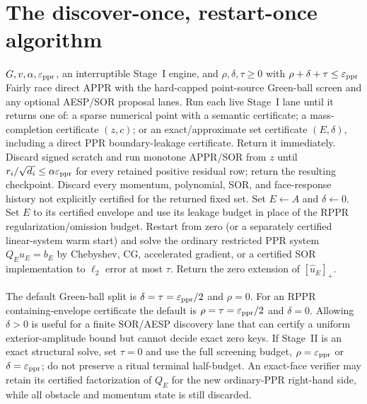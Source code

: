 \section{The discover-once, restart-once algorithm}
\label{sec:two-stage-algorithm}

\begin{algorithm}[t]
\caption{Certificate-first point-source hybrid with one optional continuation}
\label{alg:two-stage-hybrid}
\begin{algorithmic}[1]
\REQUIRE $G,v,\alpha,\varepsilon_{\mathrm{ppr}}$, an interruptible Stage~I engine, and
         $\rho,\delta,\tau\geq0$ with $\rho+\delta+\tau\leq\varepsilon_{\mathrm{ppr}}$
\STATE Fairly race direct APPR with the hard-capped point-source Green-ball
       screen and any optional AESP/SOR proposal lanes.
\STATE Run each live Stage~I lane until it returns one of: a sparse numerical point with a
       semantic certificate; a mass-completion certificate $(z,c)$; or an
       exact/approximate set certificate $(E,\delta)$, including a direct
       PPR boundary-leakage certificate.
  \STATE Return it immediately.
\ENDIF
{}
  \STATE Discard signed scratch and run monotone APPR/SOR from $z$ until
         $r_i/\sqrt{d_i}\leq\alpha\varepsilon_{\mathrm{ppr}}$ for every retained positive
         residual row; return the resulting checkpoint.
\ENDIF
\STATE Discard every momentum, polynomial, SOR, and face-response history
       not explicitly certified for the returned fixed set.
  \STATE Set $E\leftarrow A$ and $\delta\leftarrow0$.
\ENDIF
{}
  \STATE Set $E$ to its certified envelope and use its leakage budget in
         place of the RPPR regularization/omission budget.
\ENDIF
\STATE Restart from zero (or a separately certified linear-system warm start)
       and solve the ordinary restricted PPR system $Q_Eu_E=b_E$ by
       Chebyshev, CG, accelerated gradient, or a certified SOR implementation
       to $\ell_2$ error at most $\tau$.
\STATE Return the zero extension of $[\widehat u_E]_+$.
\end{algorithmic}
\end{algorithm}

The default Green-ball split is
$\delta=\tau=\varepsilon_{\mathrm{ppr}}/2$ and $\rho=0$.  For an RPPR containing-envelope
certificate the default is $\rho=\tau=\varepsilon_{\mathrm{ppr}}/2$ and $\delta=0$.  Allowing
$\delta>0$ is useful for a finite SOR/AESP discovery lane that can certify a
uniform exterior-amplitude bound but cannot decide exact zero keys.
If Stage~II is an exact structural solve, set $\tau=0$ and use the full
screening budget, $\rho=\varepsilon_{\mathrm{ppr}}$ or $\delta=\varepsilon_{\mathrm{ppr}}$; do not preserve a
ritual terminal half-budget.  An exact-face verifier may retain its certified
factorization of $Q_E$ for the new ordinary-PPR right-hand side, while all
obstacle and momentum state is still discarded.

